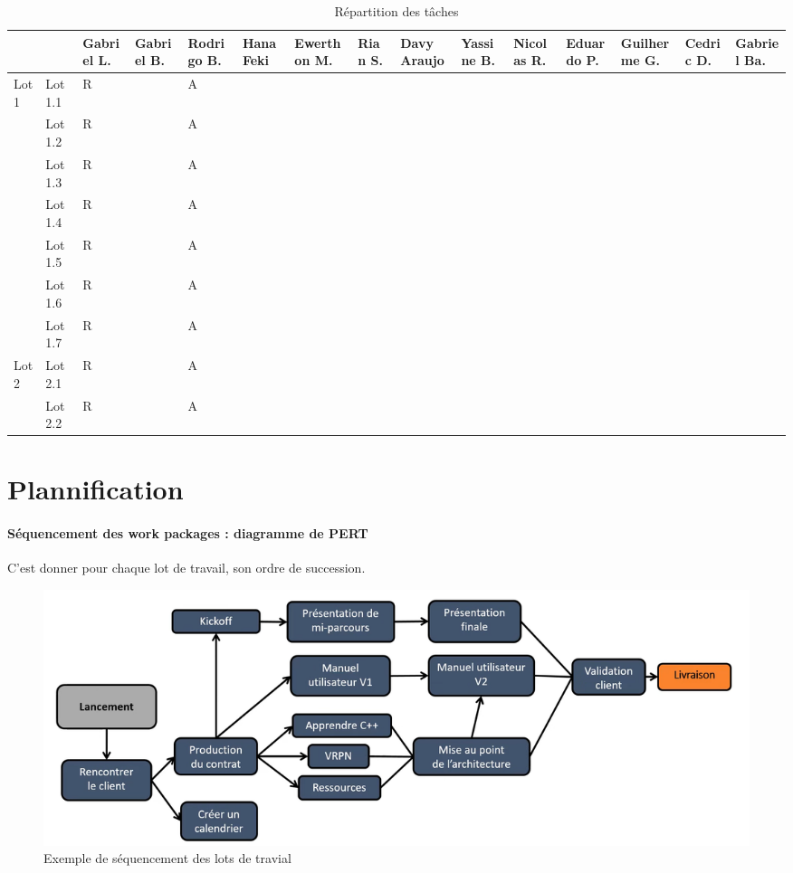 \begin{table}
\begin{tabular}{|p{1.2cm}|p{1.2cm}|p{1.2cm}|p{1.2cm}|p{1.2cm}|p{1.2cm}|p{1.2cm}|p{1.2cm}|p{1.2cm}|p{1.2cm}|p{1.2cm}|p{1.2cm}|p{1.2cm}|p{1.2cm}|p{1.2cm}|}
    \hline
    & & Gabriel L.
    &Gabriel B.
    &Rodrigo B.
    &Hana Feki
    &Ewerthon M.
    &Rian S.
    &Davy Araujo
    &Yassine B.
    &Nicolas R.
    &Eduardo P.
    &Guilherme G.
    &Cedric D.
    &Gabriel Ba.\\
    \hline
    \multirow{7}{*}{Lot 1} 
          & Lot 1.1 & R & & A & & & & & & & & & &\\
          \cline{2-15}
          & Lot 1.2 & R & & A & & & & & & & & & &\\
          \cline{2-15}
          & Lot 1.3 & R & & A & & & & & & & & & &\\
          \cline{2-15}
          & Lot 1.4 & R & & A & & & & & & & & & &\\
          \cline{2-15}
          & Lot 1.5 & R & & A & & & & & & & & & &\\
          \cline{2-15}
          & Lot 1.6 & R & & A & & & & & & & & & &\\
          \cline{2-15}
          & Lot 1.7 & R & & A & & & & & & & & & &\\
    \hline
    \multirow{2}{*}{Lot 2}
          & Lot 2.1 & R & & A & & & & & & & & & &\\
          \cline{2-15}
          & Lot 2.2 & R & & A & & & & & & & & & &\\
    \hline
\end{tabular}
\caption{Répartition des tâches}
\label{table:repartition}
\end{table}
\clearpage
\section{Plannification}
\paragraph*{Séquencement des work packages : diagramme de PERT}
C'est donner pour chaque lot de travail, son ordre de succession.
\begin{figure}[!h]
	\begin{center}
		\includegraphics[scale=0.2]{images/exemple_sequencement_lots.png}
		\caption{Exemple de séquencement des lots de travial}
	\end{center}
\end{figure}
